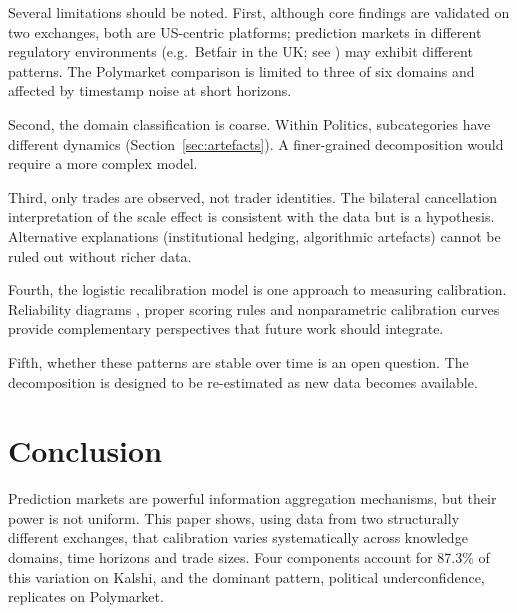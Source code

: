 \documentclass[numsec,webpdf,modern,medium]{oup-authoring-template}
\theoremstyle{thmstyleone}%
\theoremstyle{thmstyletwo}%
\theoremstyle{thmstylethree}%
\begin{document}
Several limitations should be noted. First, although core findings are validated on two exchanges, both are US-centric platforms; prediction markets in different regulatory environments (e.g.\ Betfair in the UK; see \citealp{smith2006market}) may exhibit different patterns. The Polymarket comparison is limited to three of six domains and affected by timestamp noise at short horizons.

Second, the domain classification is coarse. Within Politics, subcategories have different dynamics (Section~\ref{sec:artefacts}). A finer-grained decomposition would require a more complex model.

Third, only trades are observed, not trader identities. The bilateral cancellation interpretation of the scale effect is consistent with the data but is a hypothesis. Alternative explanations (institutional hedging, algorithmic artefacts) cannot be ruled out without richer data.

Fourth, the logistic recalibration model is one approach to measuring calibration. Reliability diagrams \citep{murphy1977reliability}, proper scoring rules \citep{gneiting2007strictly,brier1950verification} and nonparametric calibration curves provide complementary perspectives that future work should integrate.

Fifth, whether these patterns are stable over time is an open question. The decomposition is designed to be re-estimated as new data becomes available.
\section{Conclusion}\label{sec:conclusion}

Prediction markets are powerful information aggregation mechanisms, but their power is not uniform. This paper shows, using data from two structurally different exchanges, that calibration varies systematically across knowledge domains, time horizons and trade sizes. Four components account for 87.3\% of this variation on Kalshi, and the dominant pattern, political underconfidence, replicates on Polymarket.
\end{document}
